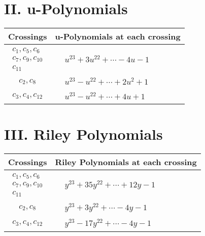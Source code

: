 \documentclass[1p]{elsarticle_modified}
\theoremstyle{definition}
\begin{document}
\newpage\renewcommand{\arraystretch}{1}
\centering \section*{ II. u-Polynomials}
\begin{tabular}{m{50pt}|m{274pt}}
Crossings & \hspace{64pt}u-Polynomials at each crossing \\
\hline $$\begin{aligned}c_{1},c_{5},c_{6}\\c_{7},c_{9},c_{10}\\c_{11}\end{aligned}$$&$\begin{aligned}
&u^{23}+3 u^{22}+\cdots-4 u-1
\end{aligned}$\\
\hline $$\begin{aligned}c_{2},c_{8}\end{aligned}$$&$\begin{aligned}
&u^{23}- u^{22}+\cdots+2 u^2+1
\end{aligned}$\\
\hline $$\begin{aligned}c_{3},c_{4},c_{12}\end{aligned}$$&$\begin{aligned}
&u^{23}- u^{22}+\cdots+4 u+1
\end{aligned}$\\
\hline
\end{tabular}\newpage\renewcommand{\arraystretch}{1}
\centering \section*{ III. Riley Polynomials}
\begin{tabular}{m{50pt}|m{274pt}}
Crossings & \hspace{64pt}Riley Polynomials at each crossing \\
\hline $$\begin{aligned}c_{1},c_{5},c_{6}\\c_{7},c_{9},c_{10}\\c_{11}\end{aligned}$$&$\begin{aligned}
&y^{23}+35 y^{22}+\cdots+12 y-1
\end{aligned}$\\
\hline $$\begin{aligned}c_{2},c_{8}\end{aligned}$$&$\begin{aligned}
&y^{23}+3 y^{22}+\cdots-4 y-1
\end{aligned}$\\
\hline $$\begin{aligned}c_{3},c_{4},c_{12}\end{aligned}$$&$\begin{aligned}
&y^{23}-17 y^{22}+\cdots-4 y-1
\end{aligned}$\\
\hline
\end{tabular}
\vskip 2pc
\end{document}
